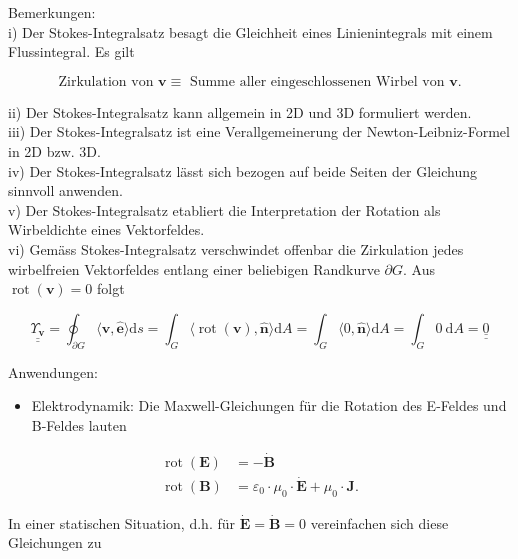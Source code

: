 \documentclass[10pt]{article}
\begin{document}
Bemerkungen:\\
i) Der Stokes-Integralsatz besagt die Gleichheit eines Linienintegrals mit einem Flussintegral. Es gilt


\begin{equation*}
\text { Zirkulation von } \mathbf{v} \equiv \text { Summe aller eingeschlossenen Wirbel von } \mathbf{v} \text {. } \tag{2.173}
\end{equation*}


ii) Der Stokes-Integralsatz kann allgemein in 2D und 3D formuliert werden.\\
iii) Der Stokes-Integralsatz ist eine Verallgemeinerung der Newton-Leibniz-Formel in 2D bzw. 3D.\\
iv) Der Stokes-Integralsatz lässt sich bezogen auf beide Seiten der Gleichung sinnvoll anwenden.\\
v) Der Stokes-Integralsatz etabliert die Interpretation der Rotation als Wirbeldichte eines Vektorfeldes.\\
vi) Gemäss Stokes-Integralsatz verschwindet offenbar die Zirkulation jedes wirbelfreien Vektorfeldes entlang einer beliebigen Randkurve $\partial G$. Aus $\operatorname{rot}(\mathbf{v})=0$ folgt


\begin{equation*}
\underline{\underline{\Upsilon_{\mathbf{v}}}}=\oint_{\partial G}\langle\mathbf{v}, \hat{\mathbf{e}}\rangle \mathrm{d} s=\int_{G}\langle\operatorname{rot}(\mathbf{v}), \hat{\mathbf{n}}\rangle \mathrm{d} A=\int_{G}\langle 0, \hat{\mathbf{n}}\rangle \mathrm{d} A=\int_{G} 0 \mathrm{~d} A=\underline{\underline{0}} \tag{2.174}
\end{equation*}


Anwendungen:

\begin{itemize}
  \item Elektrodynamik: Die Maxwell-Gleichungen für die Rotation des E-Feldes und B-Feldes lauten
\end{itemize}


\begin{align*}
\operatorname{rot}(\mathbf{E}) & =-\dot{\mathbf{B}}  \tag{2.175}\\
\operatorname{rot}(\mathbf{B}) & =\varepsilon_{0} \cdot \mu_{0} \cdot \dot{\mathbf{E}}+\mu_{0} \cdot \mathbf{J} . \tag{2.176}
\end{align*}


In einer statischen Situation, d.h. für $\dot{\mathbf{E}}=\dot{\mathbf{B}}=0$ vereinfachen sich diese Gleichungen zu
\end{document}
